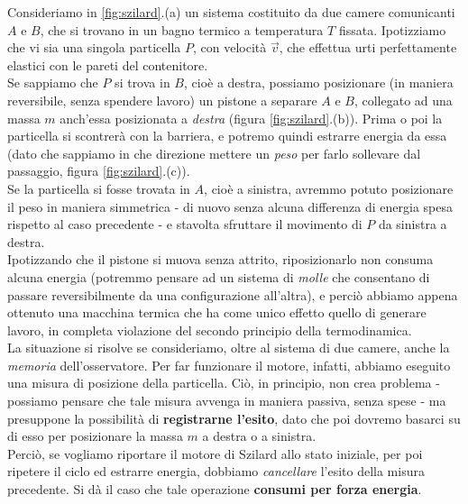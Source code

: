 \documentclass[../../InformazioneQuantistica.tex]{subfiles}
\begin{document}
Consideriamo in \ref{fig:szilard}.(a) un sistema costituito da due camere comunicanti $A$ e $B$, che si trovano in un bagno termico a temperatura $T$ fissata. Ipotizziamo che vi sia una singola particella $P$, con velocità $\vec{v}$, che effettua urti perfettamente elastici con le pareti del contenitore.\\
Se sappiamo che $P$ si trova in $B$, cioè a destra, possiamo posizionare (in maniera reversibile, senza spendere lavoro) un pistone a separare $A$ e $B$, collegato ad una massa $m$ anch'essa posizionata a \textit{destra} (figura \ref{fig:szilard}.(b)). Prima o poi la particella si scontrerà con la barriera, e potremo quindi estrarre energia da essa (dato che sappiamo in che direzione mettere un \textit{peso} per farlo sollevare dal passaggio, figura \ref{fig:szilard}.(c)).\\
Se la particella si fosse trovata in $A$, cioè a sinistra, avremmo potuto posizionare il peso in maniera simmetrica - di nuovo senza alcuna differenza di energia spesa rispetto al caso precedente - e stavolta sfruttare il movimento di $P$ da sinistra a destra.\\
Ipotizzando che il pistone si muova senza attrito, riposizionarlo non consuma alcuna energia (potremmo pensare ad un sistema di \textit{molle} che consentano di passare reversibilmente da una configurazione all'altra), e perciò abbiamo appena ottenuto una macchina termica che ha come unico effetto quello di generare lavoro, in completa violazione del secondo principio della termodinamica.\\

La situazione si risolve se consideriamo, oltre al sistema di due camere, anche la \textit{memoria} dell'osservatore. Per far funzionare il motore, infatti, abbiamo eseguito una misura di posizione della particella. Ciò, in principio, non crea problema - possiamo pensare che tale misura avvenga in maniera passiva, senza spese - ma presuppone la possibilità di \textbf{registrarne l'esito}, dato che poi dovremo basarci su di esso per posizionare la massa $m$ a destra o a sinistra.\\
Perciò, se vogliamo riportare il motore di Szilard allo stato iniziale, per poi ripetere il ciclo ed estrarre energia, dobbiamo \textit{cancellare} l'esito della misura precedente. Si dà il caso che tale operazione \textbf{consumi per forza energia}.\\
\end{document}

